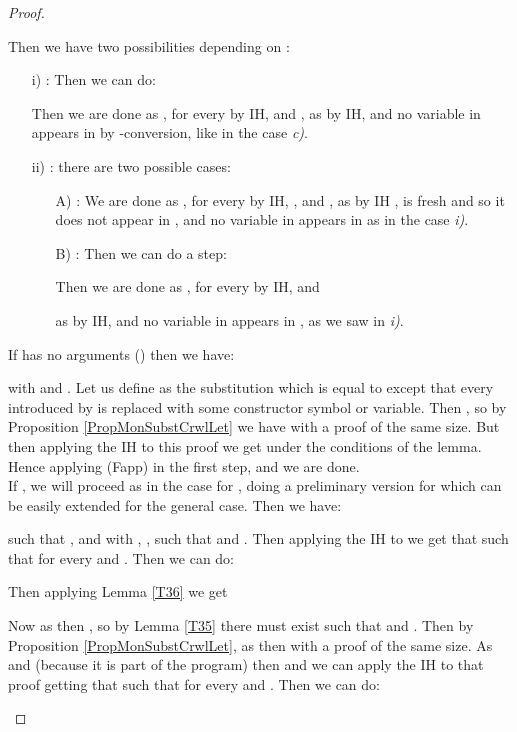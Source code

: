 \begin{proof}
\begin{description}
\begin{enumerate}
Then we have two possibilities depending on :
    \begin{enumerate}
    \item[i)] : Then we can do:

Then we are done as ,  for every  by IH, and , as  by IH, and no variable in  appears in  by -conversion, like in the case {\it c)}.\item[ii)] : there are two possible cases:
        \begin{enumerate}
    \item[A)] : We are done as ,  for every  by IH, , and , as by IH ,  is fresh and so it does not appear in , and no variable in  appears in  as in the case {\it i)}.\item[B)] : Then we can do a  step:

Then we are done as ,  for every  by IH, and 

as  by IH, and no variable in  appears in , as we saw in {\it i)}.\end{enumerate}
    \end{enumerate}

\end{enumerate}

\item[\clrule{OR}] If  has no arguments () then we have:
  
with  and . Let us define  as the substitution which is equal to  except that every
   introduced by  is replaced with some constructor symbol or
  variable. Then , so by Proposition \ref{PropMonSubstCrwlLet} we have
   with a proof of the same size. But then applying the
  IH to this proof we get  under the
  conditions of the lemma. Hence  applying (Fapp) in the first step, and we are
  done. \\

  If , we will proceed as in the case for , doing a preliminary version for  which can be easily extended for the general case. Then we have:
  
  such that , and with , , such that  and . Then applying the IH to  we get that  such that  for every
   and . Then we can do:
  
  Then applying Lemma \ref{T36} we get
  
Now as  then , so by Lemma \ref{T35} there must exist
   such that  and . Then by
  Proposition \ref{PropMonSubstCrwlLet}, as  then  with a proof of the same size. As  and  (because it is part of the program) then  and we can
  apply the IH to that proof getting that  such that  for every  and
  . Then we can do:
  

\end{description}
\end{proof}
